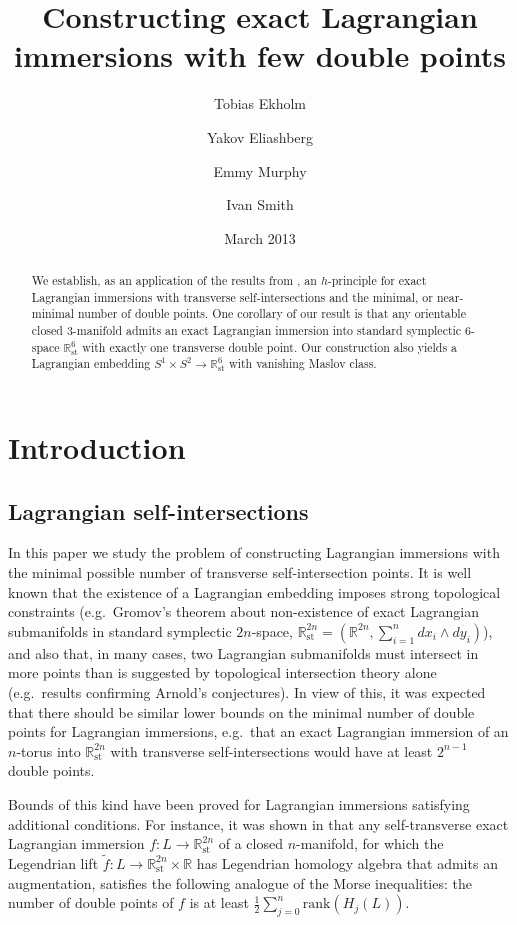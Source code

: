 \documentclass[reqno,11pt]{amsart}
\title{Constructing exact Lagrangian immersions with few double points}
\author{Tobias Ekholm}
\author{Yakov Eliashberg}
\author{Emmy Murphy}
\author{Ivan Smith}
\date{March 2013}
\numberwithin{equation}{section}
\theoremstyle{my}
\theoremstyle{my}
\theoremstyle{your}
\newcommand{\R}{\mathbb{R}}
\newcommand{\rk}{\mathrm{rank}}
\newcommand{\st}{\mathrm{st}}
\begin{document}
\thispagestyle{empty}
\setcounter{tocdepth}{1}

\begin{abstract}
We establish, as an application of the results from \cite{EliMur},   an $h$-principle for exact Lagrangian immersions with transverse self-intersections and the minimal, or  near-minimal number of double points. One corollary of our result is that any orientable closed $3$-manifold admits an exact Lagrangian immersion into standard symplectic $6$-space $\R^6_\st$ with exactly one transverse double point. Our construction  also yields a Lagrangian embedding  $S^1\times S^2\to\R^6_\st$ with vanishing Maslov class.
\end{abstract}

\maketitle


\section{Introduction}\label{Sec:intr}
\subsection*{Lagrangian self-intersections}
In this paper we study the problem of constructing Lagrangian immersions with the minimal possible number of transverse self-intersection points. It is well known that the existence of a Lagrangian embedding imposes strong topological constraints (e.g.~Gromov's theorem about non-existence of exact Lagrangian submanifolds in standard symplectic $2n$-space, $\R^{2n}_\st=(\R^{2n},\sum_{i=1}^{n} dx_i\wedge dy_i)$), and also that, in many cases, two Lagrangian submanifolds must intersect in more points than is suggested by topological intersection theory alone (e.g.~results confirming Arnold's conjectures). In view of this, it was expected that there should be similar lower bounds on the minimal number of double points for Lagrangian immersions, e.g.~that an exact Lagrangian immersion of an $n$-torus into $\R^{2n}_{\st}$ with transverse self-intersections would have at least $2^{n-1}$ double points.  

Bounds of this kind have been proved for Lagrangian immersions satisfying additional conditions.
For instance, it was shown in \cite{EESa,EESori} that any self-transverse exact Lagrangian immersion $f\colon L\to\R^{2n}_\st$ of a closed $n$-manifold, for which the Legendrian lift $\tilde f\colon L\to \R^{2n}_\st\times\R$  has Legendrian homology algebra that admits an augmentation, satisfies the following analogue of the Morse inequalities: the number of double points of $f$ is at least $\frac{1}{2}\sum_{j=0}^{n}\rk(H_{j}(L))$. 
\end{document}
